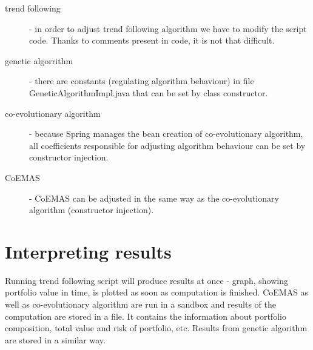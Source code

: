 \begin{description}
 \item [trend following]
      - in order to adjust trend following algorithm we have to modify the script code.
      Thanks to comments present in code, it is not that difficult.
  \item [genetic algorrithm]
      - there are constants (regulating algorithm behaviour) in file GeneticAlgorithmImpl.java that can be set by class constructor. 
  \item [co-evolutionary algorithm]
      - because Spring manages the bean creation of co-evolutionary algorithm, all coefficients responsible for adjusting algorithm behaviour can be set by constructor injection. 
  \item [CoEMAS] 
      - CoEMAS can be adjusted in the same way as the co-evolutionary algorithm (constructor injection).
\end{description}


\section{Interpreting results}

Running trend following script will produce results at once - graph, showing portfolio value in time, is plotted as soon as computation is finished.
CoEMAS as well as co-evolutionary algorithm are run in a sandbox and results of the computation are stored in a file.
It contains the information about portfolio composition, total value and risk of portfolio, etc. 
Results from genetic algorithm are stored in a similar way. 

